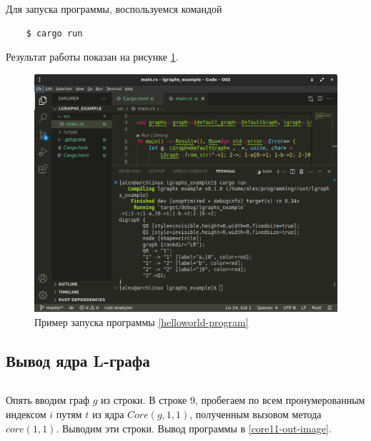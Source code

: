 Для запуска программы, воспользуемся командой
\begin{verbatim}
    $ cargo run
\end{verbatim}
Результат работы показан на рисунке \ref{helloworld-out-image}.

\begin{figure}
    \centering
    \includegraphics[scale=0.4]{static_images/install_step5.png}
    \caption{Пример запуска программы \ref{helloworld-program}}
    \label{helloworld-out-image}
\end{figure}

\subsection{Вывод ядра L-графа}

\inputminted[linenos]{rust}{../lgraphs/examples/core11.rs} \label{core11-program}

Опять вводим граф $g$ из строки. В строке 9, пробегаем по всем пронумерованным индексом $i$ путям $t$ из ядра $Core(g, 1, 1)$,
полученным вызовом метода $core(1,1)$. Выводим эти строки. Вывод программы в \ref{core11-out-image}.


